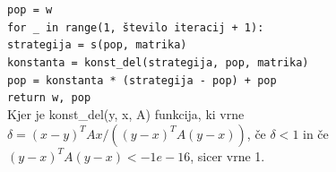 \documentclass[a4paper]{article}
\begin{document}
\hspace*{1cm}\texttt{pop = w}\\
\hspace*{1cm}\texttt{for \_ in range(1, število iteracij + 1):}\\
\hspace*{2cm}\texttt{strategija = s(pop, matrika)}\\
\hspace*{2cm}\texttt{konstanta = konst\_del(strategija, pop, matrika)}\\
\hspace*{2cm}\texttt{pop = konstanta * (strategija - pop) + pop}\\
\hspace*{1cm}\texttt{return \lbrack w, pop\rbrack }\newline \\
Kjer je konst\_del(y, x, A) funkcija, ki vrne $\delta = (x-y)^TAx/((y-x)^TA(y-x))$, če $\delta<1$ in če $(y-x)^TA(y-x)<-1e-16$, sicer vrne 1.\newline \\
\end{document}
